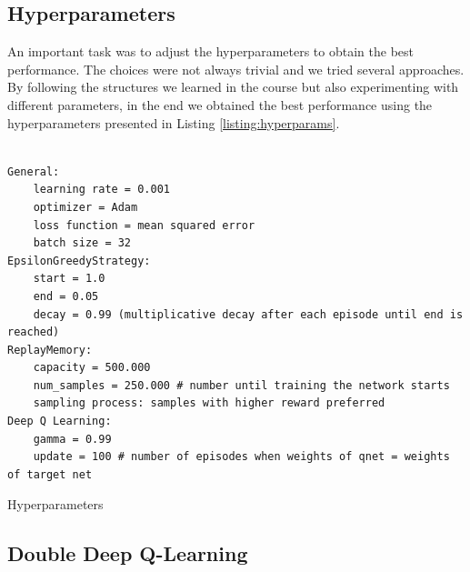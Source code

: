 \subsection{Hyperparameters}
An important task was to adjust the hyperparameters to obtain the best performance. The choices were not always trivial and we tried several approaches. 
By following the structures we learned in the course but also experimenting with different parameters, in the end we obtained the best performance using the hyperparameters presented in Listing \ref{listing:hyperparams}.


\begin{listing}[!ht]
\begin{verbatim}

General:
    learning rate = 0.001
    optimizer = Adam
    loss function = mean squared error
    batch size = 32
EpsilonGreedyStrategy:
    start = 1.0 
    end = 0.05
    decay = 0.99 (multiplicative decay after each episode until end is reached)
ReplayMemory:
    capacity = 500.000
    num_samples = 250.000 # number until training the network starts
    sampling process: samples with higher reward preferred
Deep Q Learning:
    gamma = 0.99
    update = 100 # number of episodes when weights of qnet = weights of target net

\end{verbatim}
\caption{Hyperparameters}
\label{listing:hyperparams}
\end{listing}



\subsection{Double Deep Q-Learning}\label{sec:ddql}

